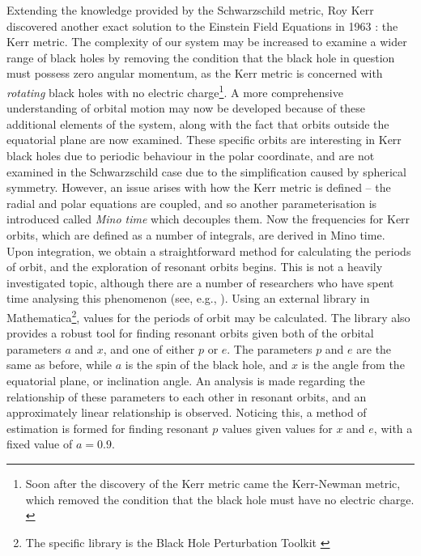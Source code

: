 Extending the knowledge provided by the Schwarzschild metric, Roy Kerr discovered another exact solution to the Einstein Field Equations in 1963 \cite{kerrMetric}: the Kerr metric.
The complexity of our system may be increased to examine a wider range of black holes by removing the condition that the black hole in question must possess zero angular momentum, as the Kerr metric is concerned with \textit{rotating} black holes with no electric charge\footnote{Soon after the discovery of the Kerr metric came the Kerr-Newman metric, which removed the condition that the black hole must have no electric charge. \cite{kerrNewmanMetric}}.
A more comprehensive understanding of orbital motion may now be developed because of these additional elements of the system, along with the fact that orbits outside the equatorial plane are now examined.
These specific orbits are interesting in Kerr black holes due to periodic behaviour in the polar coordinate, and are not examined in the Schwarzschild case due to the simplification caused by spherical symmetry.
However, an issue arises with how the Kerr metric is defined -- the radial and polar equations are coupled, and so another parameterisation is introduced called \textit{Mino time} which decouples them.
Now the frequencies for Kerr orbits, which are defined as a number of integrals, are derived in Mino time.
Upon integration, we obtain a straightforward method for calculating the periods of orbit, and the exploration of resonant orbits begins.
This is not a heavily investigated topic, although there are a number of researchers who have spent time analysing this phenomenon (see, e.g., \cite{brinkResonance, brinkKerrResonance, ruangsriCensusReso, meentEMRIReso}).
Using an external library in Mathematica\footnote{The specific library is the Black Hole Perturbation Toolkit \cite{BHPToolkit}}, values for the periods of orbit may be calculated.
The library also provides a robust tool for finding resonant orbits given both of the orbital parameters $a$ and $x$, and one of either $p$ or $e$.
The parameters $p$ and $e$ are the same as before, while $a$ is the spin of the black hole, and $x$ is the angle from the equatorial plane, or inclination angle.
An analysis is made regarding the relationship of these parameters to each other in resonant orbits, and an approximately linear relationship is observed.
Noticing this, a method of estimation is formed for finding resonant $p$ values given values for $x$ and $e$, with a fixed value of $a=0.9$.